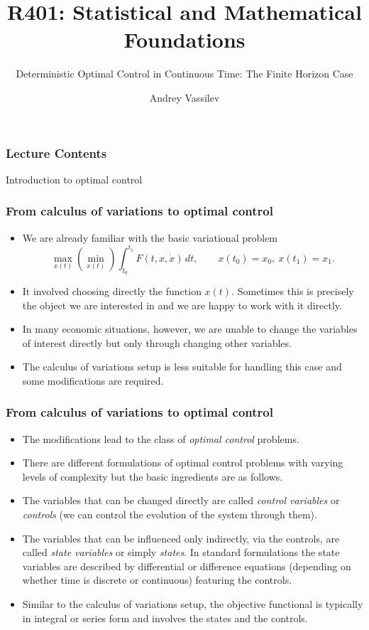 \documentclass[10pt]{beamer}
\title{R401: Statistical and Mathematical Foundations \bigskip}
\subtitle{\textcolor{myred}{Deterministic Optimal Control in Continuous Time: The Finite Horizon Case}}
\author{Andrey Vassilev}
\date{}
\theoremstyle{definition}
\begin{document}
\maketitle



\begin{frame}[fragile]
\frametitle{Lecture Contents}
\tableofcontents
\end{frame}

\begin{section}{Introduction to optimal control}\label{sec:intr}

\begin{frame}[fragile]
\frametitle{From calculus of variations to optimal control}
\begin{itemize}\itemsep1em
\item We are already familiar with the basic variational problem
\[ \max_{x(t)} \left(\min_{x(t)}\right) \int_{t_0}^{t_1}F(t,x,\dot{x})\,dt, \qquad x(t_0)=x_0,~x(t_1)=x_1. \]
\item It involved choosing directly the function $ x(t) $. Sometimes this is precisely the object we are interested in and we are happy to work with it directly.
\item In many economic situations, however, we are unable to change the variables of interest directly but only through changing other variables.
\item The calculus of variations setup is less suitable for handling this case and some modifications are required.
\end{itemize}
\end{frame}

\begin{frame}[fragile]
\frametitle{From calculus of variations to optimal control}
\begin{itemize}\itemsep1em
\item The modifications lead to the class of \emph{optimal control} problems.
\item There are different formulations of optimal control problems with varying levels of complexity but the basic ingredients are as follows.
\item The variables that can be changed directly are called \emph{control variables} or \emph{controls} (we can control the evolution of the system through them).
\item The variables that can be influenced only indirectly, via the controls, are called \emph{state variables} or simply \emph{states}. In standard formulations the state variables are described by differential or difference equations (depending on whether time is discrete or continuous) featuring the controls.
\item Similar to the calculus of variations setup, the objective functional is typically in integral or series form and involves the states and the controls.
\end{itemize}\bigskip


\end{frame}
\end{section}
\end{document}
